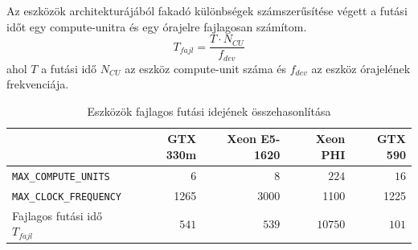 	Az eszközök architekturájából fakadó különbségek számszerűsítése végett a futási időt egy compute-unitra és egy órajelre
	fajlagosan számítom.
	\begin{equation}
	T_{fajl} = \frac{T \cdot N_{CU}}{f_{dev}}
	\end{equation}
	ahol $T$ a futási idő $N_{CU}$ az eszköz compute-unit száma és $f_{dev}$ az eszköz órajelének frekvenciája.
	
	\begin{table}[H]
	\footnotesize
	\centering
	
	\begin{tabular}{ l | r | r | r | r}
		 & GTX 330m & Xeon E5-1620 & Xeon PHI & GTX 590\\ \hline
		\texttt{MAX\_COMPUTE\_UNITS} & $6$ & $8$ & $224$ & $16$\\
		\texttt{MAX\_CLOCK\_FREQUENCY} & 1265 & 3000 & 1100 & 1225\\\hline\hline
		Fajlagos futási idő $T_{fajl}$ & $541$ & $539$ & $10750$ & $101$
	\end{tabular}
	
	\caption{Eszközök fajlagos futási idejének összehasonlítása}
	\label{table:results}
	\end{table}	
	
	